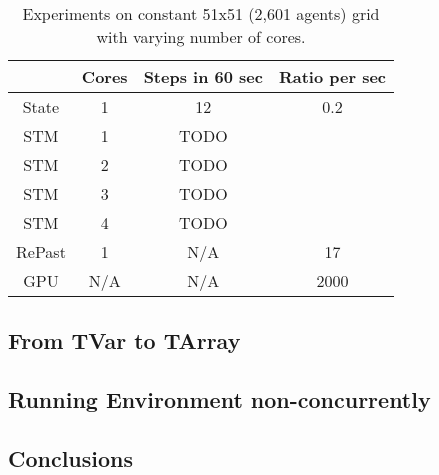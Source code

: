 \begin{table}
	\centering
  	\begin{tabular}{ c || c | c | c }
               & Cores & Steps in 60 sec & Ratio per sec \\ \hline \hline 
    	State  & 1     & 12              & 0.2   \\ \hline \hline
   		STM    & 1     & TODO            &       \\ \hline
   		STM    & 2     & TODO            &       \\ \hline
   		STM    & 3     & TODO            &       \\ \hline
   		STM    & 4     & TODO            &       \\ \hline \hline
   		RePast & 1     & N/A             & 17    \\ \hline \hline
   		GPU    & N/A   & N/A             & 2000  \\ \hline \hline
   	\end{tabular}
  	
  	\caption{Experiments on constant 51x51 (2,601 agents) grid with varying number of cores.}
	\label{tab:constgrid_varyingcores}
\end{table}


\subsection{From TVar to TArray}

\subsection{Running Environment non-concurrently}

\subsection{Conclusions}